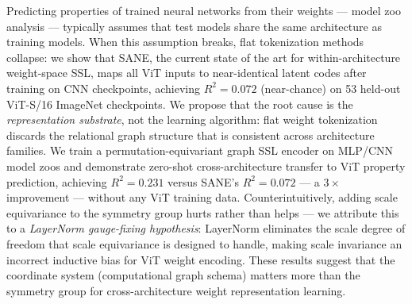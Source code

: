 Predicting properties of trained neural networks from their weights --- model zoo analysis ---
typically assumes that test models share the same architecture as training models.
When this assumption breaks, flat tokenization methods collapse:
we show that SANE, the current state of the art for within-architecture weight-space SSL,
maps all ViT inputs to near-identical latent codes after training on CNN checkpoints,
achieving $R^2 = 0.072$ (near-chance) on 53 held-out ViT-S/16 ImageNet checkpoints.
We propose that the root cause is the \emph{representation substrate}, not the learning algorithm:
flat weight tokenization discards the relational graph structure that is consistent across architecture families.
We train a permutation-equivariant graph SSL encoder on MLP/CNN model zoos
and demonstrate zero-shot cross-architecture transfer to ViT property prediction,
achieving $R^2 = 0.231$ versus SANE's $R^2 = 0.072$ --- a $3\times$ improvement ---
without any ViT training data.
Counterintuitively, adding scale equivariance to the symmetry group hurts rather than helps ---
we attribute this to a \emph{LayerNorm gauge-fixing hypothesis}:
LayerNorm eliminates the scale degree of freedom that scale equivariance is designed to handle,
making scale invariance an incorrect inductive bias for ViT weight encoding.
These results suggest that the coordinate system (computational graph schema)
matters more than the symmetry group for cross-architecture weight representation learning.
